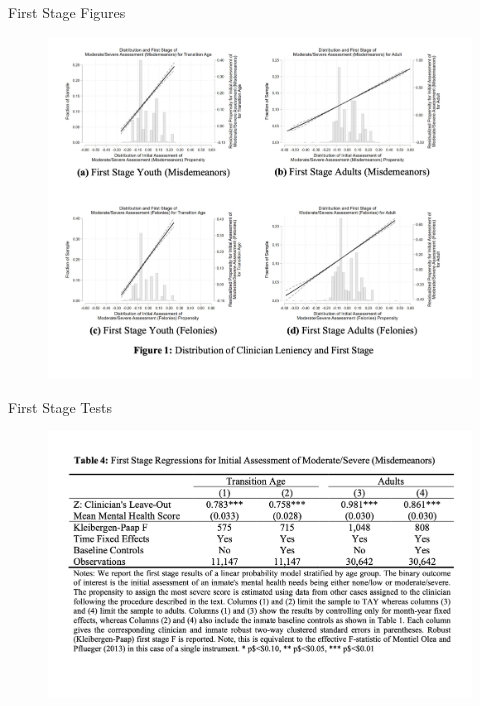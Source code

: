 \documentclass{beamer}
\begin{document}
\begin{frame}{First Stage Figures}
	\begin{figure}
             \centering
             \includegraphics[scale=0.25]{./lecture_includes/jhr_ivfig1}
	\end{figure}
\end{frame}


\begin{frame}{First Stage Tests}
	\begin{figure}
             \centering
             \includegraphics[scale=0.3]{./lecture_includes/jhr_ivfig2}
	\end{figure}
\end{frame}
\end{document}
